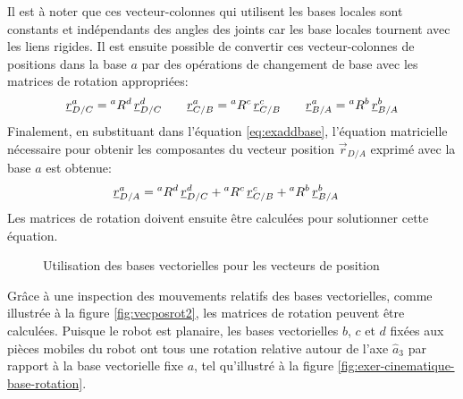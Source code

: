 Il est à noter que ces vecteur-colonnes qui utilisent les bases locales sont constants et indépendants des angles des joints car les base locales tournent avec les liens rigides. Il est ensuite possible de convertir ces vecteur-colonnes de positions dans la base $a$ par des opérations de changement de base avec les matrices de rotation appropriées:
\begin{align}
\underline{r}_{D/C}^a = {}^aR^d \, \underline{r}_{D/C}^d 
\quad \quad
\underline{r}_{C/B}^a = {}^aR^c \, \underline{r}_{C/B}^c
\quad \quad
\underline{r}_{B/A}^a = {}^aR^b \, \underline{r}_{B/A}^b
\end{align} 
Finalement, en substituant dans l'équation \eqref{eq:exaddbase}, l'équation matricielle nécessaire pour obtenir les composantes du vecteur position $\vec{r}_{D/A}$ exprimé avec la base $a$ est obtenue:
\begin{align}
\underline{r}_{D/A}^a &= {}^aR^d \, \underline{r}_{D/C}^d + {}^aR^c \, \underline{r}_{C/B}^c + {}^aR^b \, \underline{r}_{B/A}^b
\label{eq:ex333cinematique}
\end{align} 
Les matrices de rotation doivent ensuite être calculées pour solutionner cette équation.
\begin{figure}[H]
        \centering
				\hspace{10pt}
				\hspace{10pt}
        \caption{Utilisation des bases vectorielles pour les vecteurs de position}
				\label{fig:vecposrot}
\end{figure}
Grâce à une inspection des mouvements relatifs des bases vectorielles, comme illustrée à la figure \ref{fig:vecposrot2}, les matrices de rotation peuvent être calculées. Puisque le robot est planaire, les bases vectorielles $b$, $c$ et $d$ fixées aux pièces mobiles du robot ont tous une rotation relative autour de l'axe $\hat{a}_3$ par rapport à la base vectorielle fixe $a$, tel qu'illustré à la figure \ref{fig:exer-cinematique-base-rotation}.  

